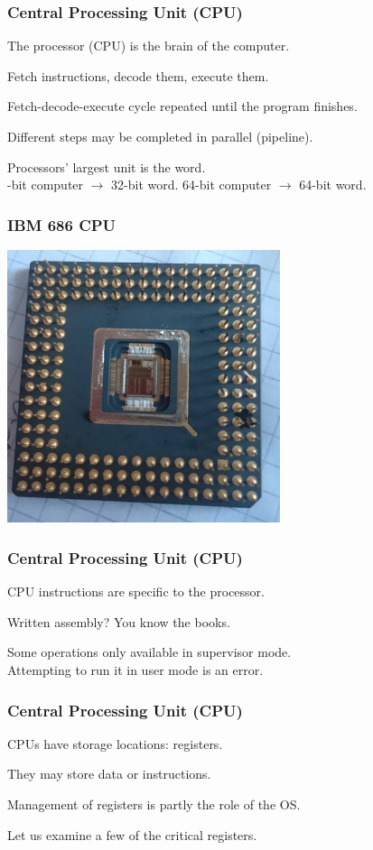 \begin{frame}
	\frametitle{Central Processing Unit (CPU)}

	The processor (CPU) is the brain of the computer.

	Fetch instructions, decode them, execute them.

	Fetch-decode-execute cycle repeated until the program finishes.

	Different steps may be completed in parallel (\alert{pipeline}).

	Processors' largest unit is the \alert{word}.\\
	-bit computer $\rightarrow$ 32-bit word. 64-bit computer $\rightarrow$ 64-bit word.

\end{frame}


\begin{frame}
	\frametitle{IBM 686 CPU}

	\begin{center}
		\includegraphics[width=0.6\textwidth]{images/686-cpu.jpg}
	\end{center}

\end{frame}


\begin{frame}
	\frametitle{Central Processing Unit (CPU)}
	CPU instructions are specific to the processor.

	Written assembly? You know the books.

	Some operations only available in supervisor mode.\\
	\quad Attempting to run it in user mode is an error.


\end{frame}

\begin{frame}
	\frametitle{Central Processing Unit (CPU)}
	CPUs have storage locations: \alert{registers}.

	They may store data or instructions.

	Management of registers is partly the role of the OS.

	Let us examine a few of the critical registers.

\end{frame}

